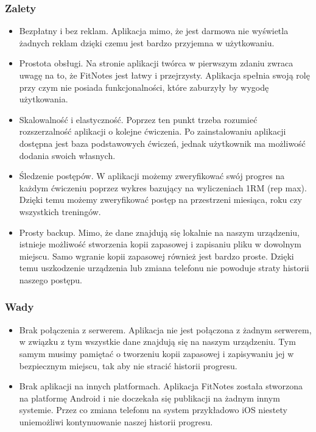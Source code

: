 \documentclass{article}
\begin{document}
            \subsubsection*{Zalety}
                  \begin{itemize}
                        \item Bezpłatny i bez reklam. Aplikacja mimo, że jest darmowa nie wyświetla żadnych reklam dzięki czemu jest bardzo przyjemna w użytkowaniu.
                        \item Prostota obsługi. Na stronie aplikacji twórca w pierwszym zdaniu zwraca uwagę na to, że FitNotes jest łatwy i przejrzysty. Aplikacja spełnia swoją rolę przy czym nie posiada funkcjonalności, które zaburzyły by wygodę użytkowania.
                        \item Skalowalność i elastyczność. Poprzez ten punkt trzeba rozumieć rozszerzalność aplikacji o kolejne ćwiczenia. Po zainstalowaniu aplikacji dostępna jest baza podstawowych ćwiczeń, jednak użytkownik ma możliwość dodania swoich własnych.
                        \item Śledzenie postępów. W aplikacji możemy zweryfikować swój progres na każdym ćwiczeniu poprzez wykres bazujący na wyliczeniach 1RM (rep max). Dzięki temu możemy zweryfikować postęp na przestrzeni miesiąca, roku czy wszystkich treningów.
                        \item Prosty backup. Mimo, że dane znajdują się lokalnie na naszym urządzeniu, istnieje możliwość stworzenia kopii zapasowej i zapisaniu pliku w dowolnym miejscu. Samo wgranie kopii zapasowej również jest bardzo proste. Dzięki temu uszkodzenie urządzenia lub zmiana telefonu nie powoduje straty historii naszego postępu.
                  \end{itemize}
            \subsubsection*{Wady}
                  \begin{itemize}
                        \item Brak połączenia z serwerem. Aplikacja nie jest połączona z żadnym serwerem, w związku z tym wszystkie dane znajdują się na naszym urządzeniu. Tym samym musimy pamiętać o tworzeniu kopii zapasowej i zapisywaniu jej w bezpiecznym miejscu, tak aby nie stracić historii progresu.
                        \item Brak aplikacji na innych platformach. Aplikacja FitNotes została stworzona na platformę Android i nie doczekała się publikacji na żadnym innym systemie. Przez co zmiana telefonu na system przykładowo iOS niestety uniemożliwi kontynuowanie naszej historii progresu.
                  \end{itemize}
\end{document}
